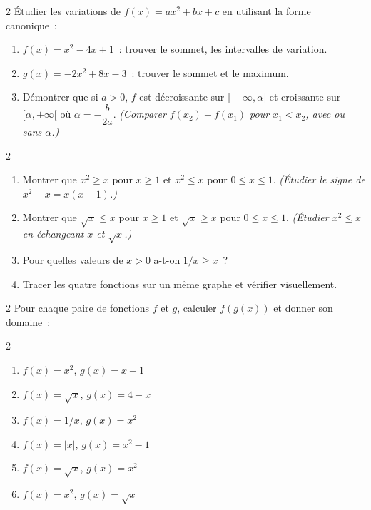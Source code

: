 \begin{exo}{2}
\'Etudier les variations de $f(x)=ax^2+bx+c$ en utilisant la forme canonique~:
\begin{enumerate}
  \item $f(x)=x^2-4x+1$~: trouver le sommet, les intervalles de variation.
  \item $g(x)=-2x^2+8x-3$~: trouver le sommet et le maximum.
  \item D\'emontrer que si $a>0$, $f$ est d\'ecroissante sur $]-\infty,\alpha]$
        et croissante sur $[\alpha,+\infty[$ o\`u $\alpha=-\dfrac{b}{2a}$.
        \emph{(Comparer $f(x_2)-f(x_1)$ pour $x_1<x_2$, avec ou sans $\alpha$.)}
\end{enumerate}
\end{exo}

\begin{exo}{2}
\begin{enumerate}
  \item Montrer que $x^2\geq x$ pour $x\geq1$ et $x^2\leq x$ pour $0\leq x\leq1$.
        \emph{(\'Etudier le signe de $x^2-x=x(x-1)$.)}
  \item Montrer que $\sqrt{x}\leq x$ pour $x\geq1$ et $\sqrt{x}\geq x$ pour $0\leq x\leq1$.
        \emph{(\'Etudier $x^2\leq x$ en \'echangeant $x$ et $\sqrt{x}$.)}
  \item Pour quelles valeurs de $x>0$ a-t-on $1/x\geq x$~?
  \item Tracer les quatre fonctions sur un m\^eme graphe et v\'erifier visuellement.
\end{enumerate}
\end{exo}

\begin{exo}{2}
Pour chaque paire de fonctions $f$ et $g$, calculer $f(g(x))$ et donner son domaine~:
\begin{multicols}{2}
\begin{enumerate}
  \item $f(x)=x^2$, $g(x)=x-1$
  \item $f(x)=\sqrt{x}$, $g(x)=4-x$
  \item $f(x)=1/x$, $g(x)=x^2$
  \item $f(x)=|x|$, $g(x)=x^2-1$
  \item $f(x)=\sqrt{x}$, $g(x)=x^2$
  \item $f(x)=x^2$, $g(x)=\sqrt{x}$
\end{enumerate}
\end{multicols}
\end{exo}


